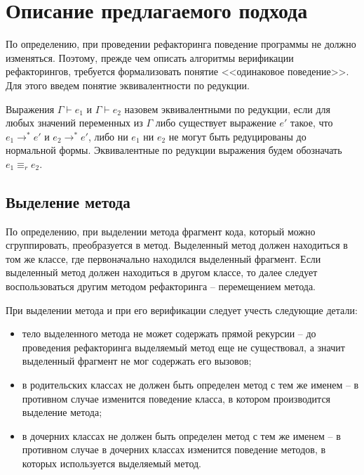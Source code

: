 \chapter{Описание предлагаемого подхода}

По определению, при проведении рефакторинга поведение программы не должно изменяться.
Поэтому, прежде чем описать алгоритмы верификации рефакторингов, требуется формализовать понятие <<одинаковое поведение>>.
Для этого введем понятие эквивалентности по редукции.
\begin{definition}
Выражения $\Gamma \vdash e_1$ и $\Gamma \vdash e_2$ назовем эквивалентными по редукции,
если для любых значений переменных из $\Gamma$ либо существует выражение $e'$ такое, что $e_1 \rightarrow^* e'$ и $e_2 \rightarrow^* e'$,
либо ни $e_1$ ни $e_2$ не могут быть редуцированы до нормальной формы.
Эквивалентные по редукции выражения будем обозначать $e_1 \equiv_r e_2$.
\end{definition}

\section{Выделение метода}

По определению, при выделении метода фрагмент кода, который можно сгруппировать, преобразуется в метод.
Выделенный метод должен находиться в том же классе, где первоначально находился выделенный фрагмент.
Если выделенный метод должен находиться в другом классе, то далее следует воспользоваться
другим методом рефакторинга -- перемещением метода.

При выделении метода и при его верификации следует учесть следующие детали:
\begin{itemize}
    \item тело выделенного метода не может содержать прямой рекурсии -- до проведения рефакторинга выделяемый метод еще не существовал, а значит выделенный фрагмент не мог содержать его вызовов;
    \item в родительских классах не должен быть определен метод с тем же именем -- в противном случае изменится поведение класса, в котором производится выделение метода;
    \item в дочерних классах не должен быть определен метод с тем же именем -- в противном случае в дочерних классах изменится поведение методов, в которых используется выделяемый метод.
\end{itemize}

